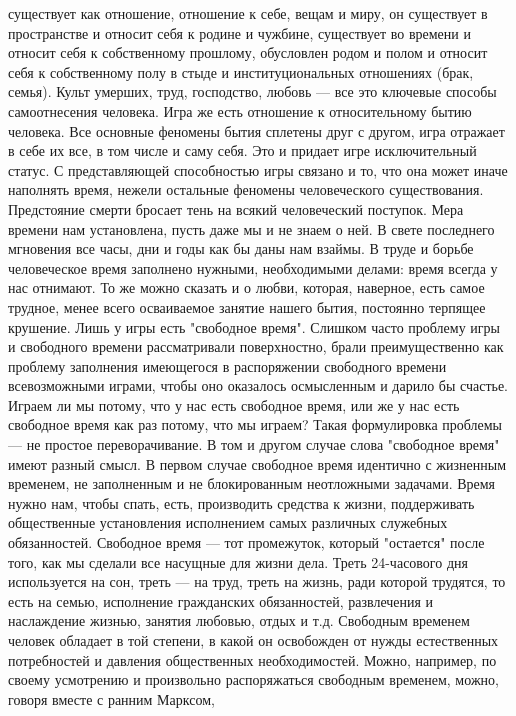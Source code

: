 \documentclass[12pt]{article}
\begin{document}
существует как отношение, отношение к себе, вещам и миру, он существует в пространстве и относит себя к
родине и чужбине, существует во времени и относит себя к собственному прошлому, обусловлен родом и полом
и относит себя к собственному полу в стыде и институциональных отношениях (брак, семья). Культ умерших,
труд, господство, любовь --- все это ключевые способы самоотнесения человека. Игра же есть отношение к
относительному бытию человека. Все основные феномены бытия сплетены друг с другом, игра отражает в себе
их все, в том числе и саму себя. Это и придает игре исключительный статус. С представляющей способностью
игры  связано  и  то,  что  она  может  иначе  наполнять  время,  нежели  остальные  феномены  человеческого
существования.  Предстояние  смерти  бросает  тень  на  всякий  человеческий  поступок.  Мера  времени  нам
установлена, пусть даже мы и не знаем о ней. В свете последнего мгновения все часы, дни и годы как бы даны
нам взаймы. В труде и борьбе человеческое время заполнено нужными, необходимыми делами: время всегда у
нас отнимают. То же можно сказать и о любви, которая, наверное, есть самое трудное, менее всего осваиваемое
занятие нашего бытия, постоянно терпящее крушение.
Лишь у игры есть "свободное время". Слишком часто проблему игры и свободного времени рассматривали
поверхностно,  брали  преимущественно  как  проблему  заполнения  имеющегося  в  распоряжении  свободного
времени всевозможными играми, чтобы  оно  оказалось  осмысленным  и  дарило бы  счастье.  Играем ли мы
потому, что у нас есть свободное время, или же у нас есть свободное время как раз потому, что мы играем?
Такая формулировка проблемы --- не простое переворачивание. В том и другом случае слова "свободное время"
имеют разный смысл. В первом случае свободное время идентично с жизненным временем, не заполненным и
не блокированным неотложными задачами. Время нужно нам, чтобы спать, есть, производить средства к жизни,
поддерживать  общественные  установления  исполнением  самых  различных  служебных  обязанностей.
Свободное время --- тот промежуток, который "остается" после того, как мы сделали все насущные для жизни
дела. Треть 24-часового дня используется на сон, треть --- на труд, треть на жизнь, ради которой трудятся, то
есть на семью, исполнение гражданских обязанностей, развлечения и наслаждение жизнью, занятия любовью,
отдых  и  т.д.  Свободным  временем  человек  обладает  в  той  степени,  в  какой  он  освобожден  от  нужды
естественных  потребностей  и  давления  общественных  необходимостей.  Можно,  например,  по  своему 
усмотрению и произвольно распоряжаться свободным временем, можно, говоря вместе с ранним Марксом,
\end{document}

